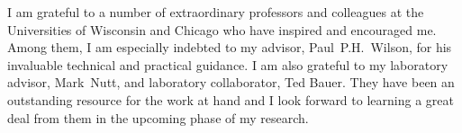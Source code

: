 I am grateful to a number of extraordinary professors and colleagues at the 
Universities of Wisconsin and Chicago who have inspired and encouraged me. Among  
them, I am especially indebted to my advisor, Paul~P.H.~Wilson, for his invaluable 
technical and practical guidance. I am also grateful to my laboratory advisor, 
Mark~Nutt, and laboratory collaborator, Ted Bauer. They have been an outstanding 
resource for the work at hand and I look forward to learning a great deal from 
them in the upcoming phase of my research.
